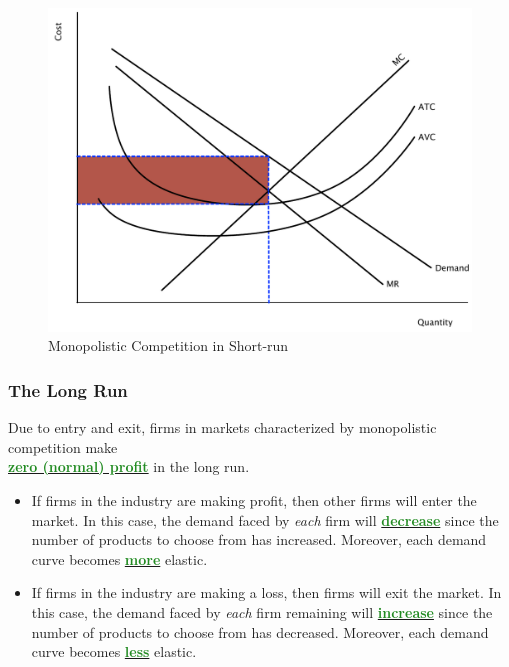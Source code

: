 \documentclass[11pt]{article}\usepackage[]{graphicx}\usepackage[]{color}
\theoremstyle{definition}
\newcommand{\dd}[1]{{\underline{\textbf{\textcolor{ForestGreen}{#1}}}}}
\begin{document}
		\begin{figure}[H]
			\centering
			\includegraphics[scale=.40]{plot80.pdf}
			\caption{Monopolistic Competition in Short-run}
		\end{figure}
	
	\subsubsection*{The Long Run}
	
	Due to entry and exit, firms in markets characterized by monopolistic competition make \\ \dd{zero (normal) profit} in the long run. 
	
	\begin{itemize}
		
		
		\item If firms in the industry are making profit, then other firms will enter the market. In this case, the demand faced by \textit{each} firm will \dd{decrease} since the number of products to choose from has increased. Moreover, each demand curve becomes \dd{more} elastic.
		
		\item If firms in the industry are making a loss, then firms will exit the market. In this case, the demand faced by \textit{each} firm remaining will \dd{increase} since the number of products to choose from has decreased. Moreover, each demand curve becomes \dd{less} elastic.
		
	\end{itemize}
	
\end{document}
